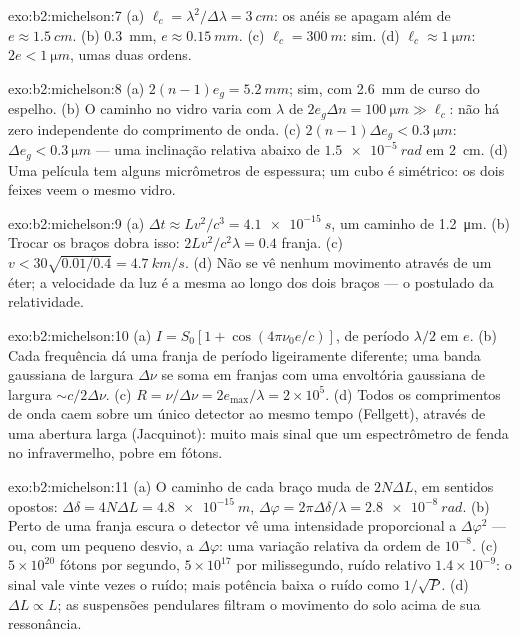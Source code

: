 \begin{solution}{exo:b2:michelson:7}
(a) $\ell_c = \lambda^2/\Delta\lambda = \qty{3}{cm}$: os anéis se apagam além de $e \approx \qty{1.5}{cm}$. (b)
\qty{0.3}{mm}, $e \approx \qty{0.15}{mm}$. (c) $\ell_c = \qty{300}{m}$: sim. (d) $\ell_c \approx \qty{1}{\micro m}$:
$2e < \qty{1}{\micro m}$, umas duas ordens.
\end{solution}

\begin{solution}{exo:b2:michelson:8}
(a) $2(n - 1)e_g = \qty{5.2}{mm}$; sim, com \qty{2.6}{mm} de curso do espelho. (b) O
caminho no vidro varia com $\lambda$ de $2e_g\Delta n = \qty{100}{\micro m} \gg \ell_c$: não há
zero independente do comprimento de onda. (c) $2(n - 1)\Delta e_g < \qty{0.3}{\micro m}$: $\Delta e_g <
\qty{0.3}{\micro m}$ --- uma inclinação relativa abaixo de $\qty{1.5e-5}{rad}$ em \qty{2}{cm}. (d) Uma
película tem alguns micrômetros de espessura; um cubo é simétrico: os dois feixes veem
o mesmo vidro.
\end{solution}

\begin{solution}{exo:b2:michelson:9}
(a) $\Delta t \approx Lv^2/c^3 = \qty{4.1e-15}{s}$, um caminho de \qty{1.2}{\micro m}. (b) Trocar os
braços dobra isso: $2Lv^2/c^2\lambda = 0.4$ franja. (c) $v < 30\sqrt{0.01/0.4} =
\qty{4.7}{km/s}$. (d) Não se vê nenhum movimento através de um éter; a velocidade da luz
é a mesma ao longo dos dois braços --- o postulado da relatividade.
\end{solution}

\begin{solution}{exo:b2:michelson:10}
(a) $I = S_0[1 + \cos(4\pi\nu_0e/c)]$, de período $\lambda/2$ em $e$. (b) Cada frequência
dá uma franja de período ligeiramente diferente; uma banda gaussiana de largura
$\Delta\nu$ se soma em franjas com uma envoltória gaussiana de largura $\sim c/2\Delta\nu$.
(c) $R = \nu/\Delta\nu = 2e_{\max}/\lambda = 2 \times 10^5$. (d) Todos os comprimentos de onda caem sobre
um único detector ao mesmo tempo (Fellgett), através de uma abertura larga (Jacquinot):
muito mais sinal que um espectrômetro de fenda no infravermelho, pobre em
fótons.
\end{solution}

\begin{solution}{exo:b2:michelson:11}
(a) O caminho de cada braço muda de $2N\Delta L$, em sentidos opostos: $\Delta\delta = 4N\Delta L
= \qty{4.8e-15}{m}$, $\Delta\varphi = 2\pi\Delta\delta/\lambda = \qty{2.8e-8}{rad}$. (b) Perto de uma franja
escura o detector vê uma intensidade proporcional a $\Delta\varphi^2$ --- ou,
com um pequeno desvio, a $\Delta\varphi$: uma variação relativa da ordem de $10^{-8}$. (c)
$5 \times 10^{20}$ fótons por segundo, $5 \times 10^{17}$ por milissegundo, ruído
relativo $1.4 \times 10^{-9}$: o sinal vale vinte vezes o ruído; mais potência
baixa o ruído como $1/\sqrt P$. (d) $\Delta L \propto L$; as suspensões pendulares
filtram o movimento do solo acima de sua ressonância.
\end{solution}

